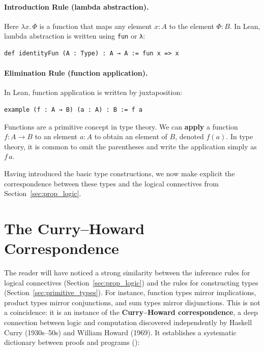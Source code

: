 \paragraph{Introduction Rule (lambda abstraction).}
\begin{prooftree}
\end{prooftree}

\noindent
Here $\lambda x.\,\Phi$ is a function that maps any element $x : A$
to the element $\Phi : B$.
In Lean, lambda abstraction is written using
\lstinline[language=lean]|fun| or \lstinline[language=lean]|λ|:
\begin{lstlisting}[language=lean]
def identityFun (A : Type) : A → A := fun x => x
\end{lstlisting}

\paragraph{Elimination Rule (function application).}
\begin{prooftree}
\end{prooftree}

\noindent In Lean, function application is written by juxtaposition:
\begin{lstlisting}[language=lean]
example (f : A → B) (a : A) : B := f a
\end{lstlisting}

Functions are a primitive concept in type theory.
We can \textbf{apply} a function $f : A \to B$ to an element $a : A$
to obtain an element of $B$, denoted $f(a)$.
In type theory, it is common to omit the parentheses and write the
application simply as $f\, a$.

Having introduced the basic type constructions, we now make explicit
the correspondence between these types and the logical connectives
from Section~\ref{sec:prop_logic}.

\section{The Curry--Howard Correspondence}\label{sec:curry_howard}

The reader will have noticed a strong similarity between the
inference rules for logical connectives
(Section~\ref{sec:prop_logic}) and the rules for constructing types
(Section~\ref{sec:primitive_types}).
For instance, function types mirror implications, product types
mirror conjunctions, and sum types mirror disjunctions.
This is not a coincidence: it is an instance of the
\textbf{Curry--Howard correspondence}, a deep connection between
logic and computation discovered independently by Haskell Curry
(1930s--50s) and William Howard (1969).
It establishes a systematic dictionary between proofs and programs (\cite{thompson1999types}):

